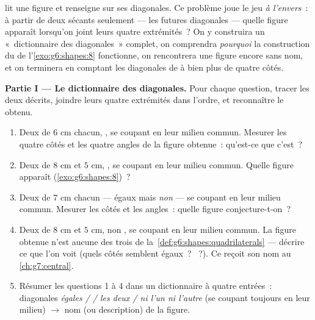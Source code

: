 \begin{problem}
\label{pb:g6:shapes:1}
 lit une figure et renseigne sur ses
diagonales. Ce problème joue le jeu \emph{à l'envers}~: à partir de
deux  sécants seulement --- les futures diagonales --- quelle
figure apparaît lorsqu'on joint leurs quatre extrémités~? On y
construira un «~dictionnaire des diagonales~» complet, on comprendra
\emph{pourquoi} la construction du  de
l'\cref{exo:g6:shapes:8} fonctionne, on rencontrera une figure encore
sans nom, et on terminera en comptant les diagonales de  à
bien plus de quatre côtés.

\medskip
\noindent\textbf{Partie I --- Le dictionnaire des diagonales.}
Pour chaque question, tracer les deux  décrits, joindre leurs
quatre extrémités dans l'ordre, et reconnaître le 
obtenu.
\begin{enumerate}
  \item Deux  de $6$ cm chacun, , se coupant
        en leur milieu commun. Mesurer les quatre côtés et les
        quatre angles de la figure obtenue~: qu'est-ce que c'est~?
  \item Deux  de $8$ cm et $5$ cm, , se
        coupant en leur milieu commun. Quelle figure apparaît
        (\cref{exo:g6:shapes:8})~?
  \item Deux  de $7$ cm chacun --- égaux mais \emph{non}
         --- se coupant en leur milieu commun.
        Mesurer les côtés et les angles~: quelle figure
        conjecture-t-on~?
  \item Deux  de $8$ cm et $5$ cm, non , se
        coupant en leur milieu commun. La figure obtenue n'est
        aucune des trois de la~\cref{def:g6:shapes:quadrilaterals} ---
        décrire ce que l'on voit (quels côtés semblent égaux~?
        ~?). Ce  reçoit son nom au
        \cref{ch:g7:central}.
  \item Résumer les questions 1 à 4 dans un dictionnaire à quatre
        entrées~: diagonales \emph{égales /  / les
        deux / ni l'un ni l'autre} (se coupant toujours en leur
        milieu) $\rightarrow$ nom (ou description) de la figure.
\end{enumerate}


\end{problem}
